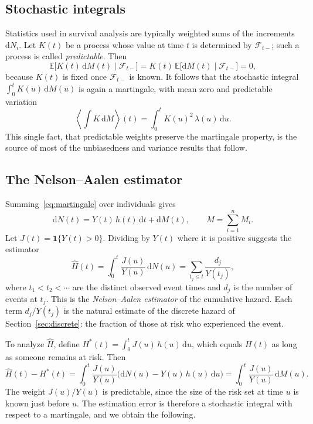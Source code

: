 \documentclass[11pt]{article}
\theoremstyle{definition}
\theoremstyle{plain}
\newcommand{\E}{\mathbb{E}}
\newcommand{\dd}{\,\mathrm{d}}
\begin{document}
\subsection{Stochastic integrals}

Statistics used in survival analysis are typically weighted sums of the increments $\mathrm{d}N_i$. Let $K(t)$ be a process whose value at time $t$ is determined by $\mathcal{F}_{t-}$; such a process is called \emph{predictable}. Then
\[
  \E\bigl[K(t)\,\mathrm{d}M(t) \mid \mathcal{F}_{t-}\bigr]
  = K(t)\,\E\bigl[\mathrm{d}M(t) \mid \mathcal{F}_{t-}\bigr] = 0,
\]
because $K(t)$ is fixed once $\mathcal{F}_{t-}$ is known. It follows that the stochastic integral $\int_0^t K(u) \dd M(u)$ is again a martingale, with mean zero and predictable variation
\begin{equation}\label{eq:stoch-int-var}
  \left\langle \int K \dd M \right\rangle(t)
  = \int_0^t K(u)^2\,\lambda(u) \dd u.
\end{equation}
This single fact, that predictable weights preserve the martingale property, is the source of most of the unbiasedness and variance results that follow.

\subsection{The Nelson--Aalen estimator}

Summing~\eqref{eq:martingale} over individuals gives
\[
  \mathrm{d}N(t) = Y(t)\,h(t)\dd t + \mathrm{d}M(t),
  \qquad M = \sum_{i=1}^n M_i.
\]
Let $J(t) = \mathbf{1}\{Y(t) > 0\}$. Dividing by $Y(t)$ where it is positive suggests the estimator
\begin{equation}\label{eq:nelson-aalen}
  \widehat{H}(t) = \int_0^t \frac{J(u)}{Y(u)} \dd N(u)
  = \sum_{t_j \le t} \frac{d_j}{Y(t_j)},
\end{equation}
where $t_1 < t_2 < \cdots$ are the distinct observed event times and $d_j$ is the number of events at $t_j$. This is the \emph{Nelson--Aalen estimator} of the cumulative hazard. Each term $d_j / Y(t_j)$ is the natural estimate of the discrete hazard of Section~\ref{sec:discrete}: the fraction of those at risk who experienced the event.

To analyze $\widehat{H}$, define $H^*(t) = \int_0^t J(u)\,h(u) \dd u$, which equals $H(t)$ as long as someone remains at risk. Then
\[
  \widehat{H}(t) - H^*(t)
  = \int_0^t \frac{J(u)}{Y(u)} \bigl(\mathrm{d}N(u) - Y(u)\,h(u)\dd u\bigr)
  = \int_0^t \frac{J(u)}{Y(u)} \dd M(u).
\]
The weight $J(u)/Y(u)$ is predictable, since the size of the risk set at time $u$ is known just before $u$. The estimation error is therefore a stochastic integral with respect to a martingale, and we obtain the following.
\end{document}
